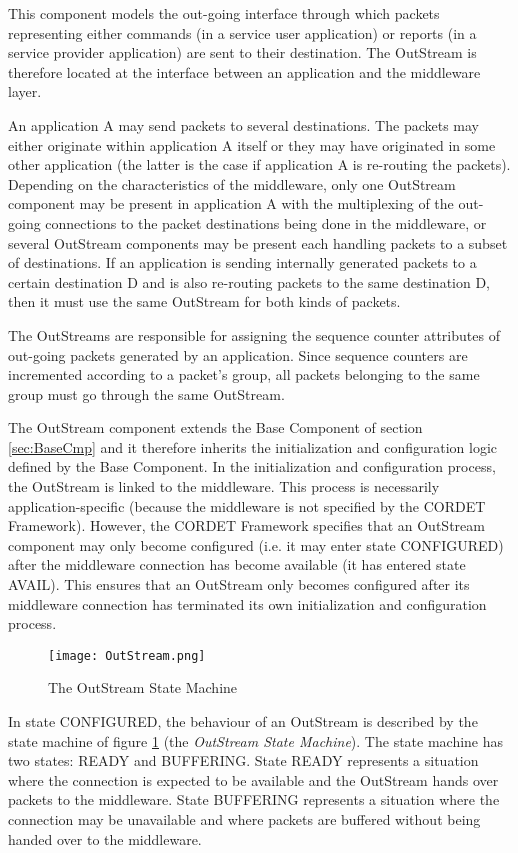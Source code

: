 This component models the out-going interface through which packets representing either commands (in a service user application) or reports (in a service provider application) are sent to their destination. The OutStream is therefore located at the interface between an application and the middleware layer. 

An application A may send packets to several destinations. The packets may either originate within application A itself or they may have originated in some other application (the latter is the case if application A is re-routing the packets). Depending on the characteristics of the middleware, only one OutStream component may be present in application A with the multiplexing of the out-going connections to the packet destinations being done in the middleware, or several OutStream components may be present each handling packets to a subset of destinations. If an application is sending internally generated packets to a certain destination D and is also re-routing packets to the same destination D, then it must use the same OutStream for both kinds of packets. 

The OutStreams are responsible for assigning the sequence counter attributes of out-going packets generated by an application. Since sequence counters are incremented according to a packet's group, all packets belonging to the same group must go through the same OutStream.

The OutStream component extends the Base Component of section \ref{sec:BaseCmp} and it therefore inherits the initialization and configuration logic defined by the Base Component. In the initialization and configuration process, the OutStream is linked to the middleware. This process is necessarily application-specific (because the middleware is not specified by the CORDET Framework). However, the CORDET Framework specifies that an OutStream component may only become configured (i.e. it may enter state CONFIGURED) after the middleware connection has become available (it has entered state AVAIL). This ensures that an OutStream only becomes configured after its middleware connection has terminated its own initialization and configuration process.

\begin{figure}[ht]
 \centering
 \texttt{[image: OutStream.png]}
 \caption{The OutStream State Machine}
 \label{fig:OutStream}
\end{figure}

In state CONFIGURED, the behaviour of an OutStream is described by the state machine of figure \ref{fig:OutStream} (the \textit{OutStream State Machine}). The state machine has two states: READY and BUFFERING. State READY represents a situation where the connection is expected to be available and the OutStream hands over packets to the middleware. State BUFFERING represents a situation where the connection may be unavailable and where packets are buffered without being handed over to the middleware.

